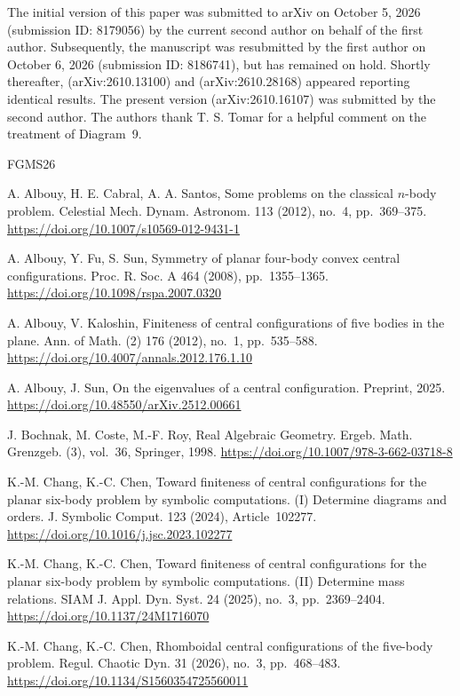 \documentclass[Threeside,11pt]{article}
\theoremstyle{definition}
\theoremstyle{remark}
\numberwithin{equation}{section}
\theoremstyle{remark}
\begin{document}
The initial version of this paper was submitted to arXiv on October 5, 2026 (submission ID: 8179056) by the current second author on behalf of the first author. Subsequently, the manuscript was resubmitted by the first author on October 6, 2026 (submission ID: 8186741), but has remained on hold. Shortly thereafter, \cite{FiveT} (arXiv:2610.13100) and \cite{LL26planar} (arXiv:2610.28168) appeared reporting identical results. The present version (arXiv:2610.16107) was submitted by the second author. The authors thank T. S. Tomar for a helpful comment on the treatment of Diagram~9.




\begin{thebibliography}{FGMS26}

A. Albouy, H. E. Cabral, A. A. Santos,
Some problems on the classical $n$-body problem.
Celestial Mech. Dynam. Astronom. 113 (2012), no.~4, pp.~369--375.
\url{https://doi.org/10.1007/s10569-012-9431-1}

A. Albouy, Y. Fu, S. Sun,
Symmetry of planar four-body convex central configurations.
Proc. R. Soc. A 464 (2008), pp.~1355--1365.
\url{https://doi.org/10.1098/rspa.2007.0320}

A. Albouy, V. Kaloshin,
Finiteness of central configurations of five bodies in the
plane.
Ann. of Math. (2) 176 (2012), no.~1, pp.~535--588.
\url{https://doi.org/10.4007/annals.2012.176.1.10}

A. Albouy, J. Sun,
On the eigenvalues of a central configuration.
Preprint, 2025.
\url{https://doi.org/10.48550/arXiv.2512.00661}

J. Bochnak, M. Coste, M.-F. Roy,
Real Algebraic Geometry.
Ergeb. Math. Grenzgeb. (3), vol.~36, Springer, 1998.
\url{https://doi.org/10.1007/978-3-662-03718-8}

K.-M. Chang, K.-C. Chen,
Toward finiteness of central configurations for the planar
six-body problem by symbolic computations. (I) Determine diagrams and orders.
J. Symbolic Comput. 123 (2024), Article~102277.
\url{https://doi.org/10.1016/j.jsc.2023.102277}

K.-M. Chang, K.-C. Chen,
Toward finiteness of central configurations for the planar
six-body problem by symbolic computations. (II) Determine mass relations.
SIAM J. Appl. Dyn. Syst. 24 (2025), no.~3, pp.~2369--2404.
\url{https://doi.org/10.1137/24M1716070}

K.-M. Chang, K.-C. Chen,
Rhomboidal central configurations of the five-body problem.
Regul. Chaotic Dyn. 31 (2026), no.~3, pp.~468--483.
\url{https://doi.org/10.1134/S1560354725560011}


\end{thebibliography}
\end{document}

